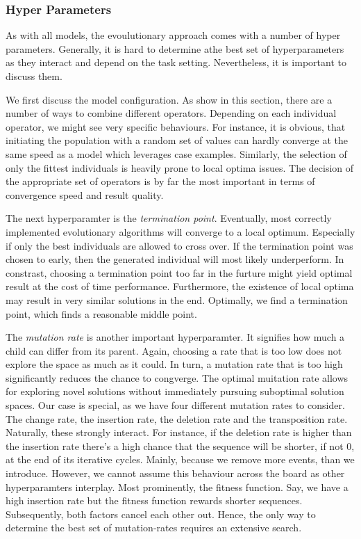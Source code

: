 \documentclass[./../../paper.tex]{subfiles}
\begin{document}
\subsubsection{Hyper Parameters}
As with all models, the evoulutionary approach comes with a number of hyper parameters. Generally, it is hard to determine athe best set of hyperparameters as they interact and depend on the task setting. Nevertheless, it is important to discuss them. 

We first discuss the model configuration. As show in this section, there are a number of ways to combine different operators. Depending on each individual operator, we might see very specific behaviours. For instance, it is obvious, that initiating the population with a random set of values can hardly converge at the same speed as a model which leverages case examples. Similarly, the selection of only the fittest individuals is heavily prone to local optima issues. The decision of the appropriate set of operators is by far the most important in terms of convergence speed and result quality. 

The next hyperparamter is the \emph{termination point}. Eventually, most correctly implemented evolutionary algorithms will converge to a local optimum. Especially if only the best individuals are allowed to cross over. If the termination point was chosen to early, then the generated individual will most likely underperform. In constrast, choosing a termination point too far in the furture might yield optimal result at the cost of time performance. Furthermore, the existence of local optima may result in very similar solutions in the end. Optimally, we find a termination point, which finds a reasonable middle point.

The \emph{mutation rate} is another important hyperparamter. It signifies how much a child can differ from its parent. Again, choosing a rate that is too low does not explore the space as much as it could. In turn, a mutation rate that is too high significantly reduces the chance to congverge. The optimal muitation rate allows for exploring novel solutions without immediately pursuing suboptimal solution spaces. Our case is special, as we have four different mutation rates to consider. The change rate, the insertion rate, the deletion rate and the transposition rate. Naturally, these strongly interact. For instance, if the deletion rate is higher than the insertion rate there's a high chance that the sequence will be shorter, if not 0, at the end of its iterative cycles. Mainly, because we remove more events, than we introduce. However, we cannot assume this behaviour across the board as other hyperparamters interplay. Most prominently, the fitness function. Say, we have a high insertion rate but the fitness function rewards shorter sequences. Subsequently, both factors cancel each other out. Hence, the only way to determine the best set of mutation-rates requires an extensive search.
\end{document}
